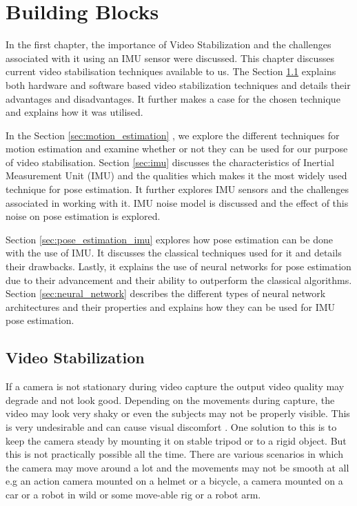 \chapter{Building Blocks} \label{chapter_two}

In the first chapter, the importance of Video Stabilization and the challenges associated with it using an IMU sensor were discussed. This chapter discusses current video stabilisation techniques available to us. The Section \ref{sec:video_stabilization} explains both hardware and software based video stabilization techniques and details their advantages and disadvantages. It further makes a case for the chosen technique and explains how it was utilised. 

In the Section \ref{sec:motion_estimation} , we explore the different techniques for motion estimation and examine whether or not they can be used for our purpose of video stabilisation. Section \ref{sec:imu} discusses the characteristics of Inertial Measurement Unit (IMU) and the qualities which makes it the most widely used technique for pose estimation. It further explores IMU sensors and the challenges associated in working with it.  IMU noise model is discussed and the effect of this noise on pose estimation is explored.

Section \ref{sec:pose_estimation_imu} explores how pose estimation can be done with the use of IMU. It discusses the classical techniques used for it and details their drawbacks. Lastly, it explains the use of neural networks for pose estimation due to their advancement and their ability to outperform the classical algorithms. Section \ref{sec:neural_network} describes the different types of neural network architectures and their properties and explains how they can be used for IMU pose estimation.

\section{Video Stabilization}
\label{sec:video_stabilization}
If a camera is not stationary during video capture the output video quality may degrade and not look good. Depending on the movements during capture, the video may look very shaky or even the subjects may not be properly visible. This is very undesirable and can cause visual discomfort \citep{jia2012probabilistic}. One solution to this is to keep the camera steady by mounting it on stable tripod or to a rigid object. But this is not practically possible all the time. There are various scenarios in which the camera may move around a lot and the movements may not be smooth at all e.g an action camera mounted on a helmet or a bicycle, a camera mounted on a car or a robot in wild or some move-able rig or a robot arm.


